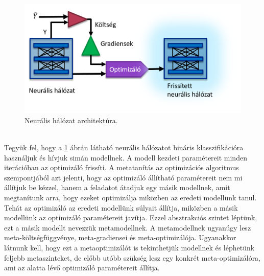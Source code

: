 \begin{figure}[!ht]
	\centering
	\includegraphics[width=120mm, keepaspectratio]{figures/nn-arch.png}
	\caption{Neurális hálózat architektúra.}
	\label{fig:nn-arch}
\end{figure}
\ \\
Tegyük fel, hogy a \ref{fig:nn-arch} ábrán látható neurális hálózatot bináris klasszifikációra használjuk és hívjuk simán modellnek. A modell kezdeti paramétereit minden iterációban az optimizáló frissíti. A metatanítás az optimizációs algoritmus szempontjából azt jelenti, hogy az optimizáló állítható paramétereit nem mi állítjuk be kézzel, hanem a feladatot átadjuk egy másik modellnek, amit megtanítunk arra, hogy ezeket optimizálja miközben az eredeti modellünk tanul. Tehát az optimizáló az eredeti modellünk súlyait állítja, miközben a másik modellünk az optimizáló paramétereit javítja.
\newline
\newline
Ezzel absztrakciós szintet léptünk, ezt a másik modellt nevezzük metamodellnek. A metamodellnek ugyanúgy lesz meta-költségfüggvénye, meta-gradiensei és meta-optimizálója. Ugyanakkor látnunk kell, hogy ezt a metaoptimizálót is tekinthetjük modellnek és léphetünk feljebb metaszinteket, de előbb utóbb szükség lesz egy konkrét meta-optimizálóra, ami az alatta lévő optimizáló paramétereit állítja. 

